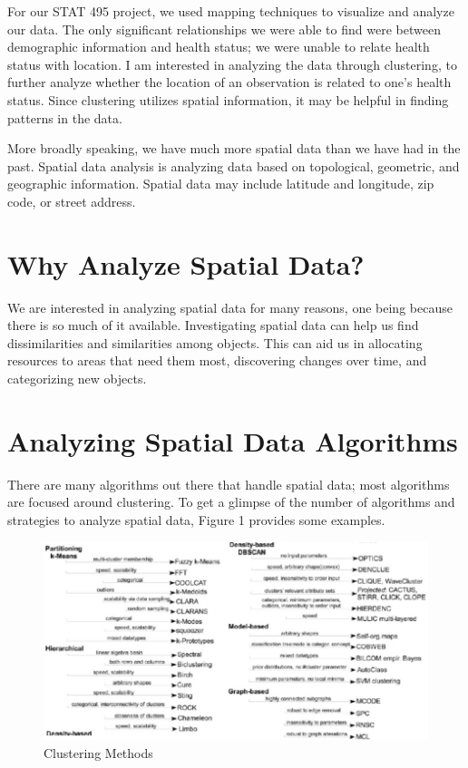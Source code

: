 \documentclass[12pt,twoside]{amherstthesis}
\begin{document}
  For our STAT 495 project, we used mapping techniques to visualize and
  analyze our data. The only significant relationships we were able to
  find were between demographic information and health status; we were
  unable to relate health status with location. I am interested in
  analyzing the data through clustering, to further analyze whether the
  location of an observation is related to one's health status. Since
  clustering utilizes spatial information, it may be helpful in finding
  patterns in the data.
  
  More broadly speaking, we have much more spatial data than we have had
  in the past. Spatial data analysis is analyzing data based on
  topological, geometric, and geographic information. Spatial data may
  include latitude and longitude, zip code, or street address.
  
  \section{Why Analyze Spatial Data?}\label{why-analyze-spatial-data}
  
  We are interested in analyzing spatial data for many reasons, one being
  because there is so much of it available. Investigating spatial data can
  help us find dissimilarities and similarities among objects. This can
  aid us in allocating resources to areas that need them most, discovering
  changes over time, and categorizing new objects.
  
  \section{Analyzing Spatial Data
  Algorithms}\label{analyzing-spatial-data-algorithms}
  
  There are many algorithms out there that handle spatial data; most
  algorithms are focused around clustering. To get a glimpse of the number
  of algorithms and strategies to analyze spatial data, Figure 1 provides
  some examples.
  
  \begin{figure}[htbp]
  \centering
  \includegraphics[scale = 0.5,angle = 0]{clustering_methods.png}
  \caption[Clustering Methods]{\normalsize{Clustering Methods}}
  \label{fig:Clustering}
  \end{figure}
  
\end{document}

